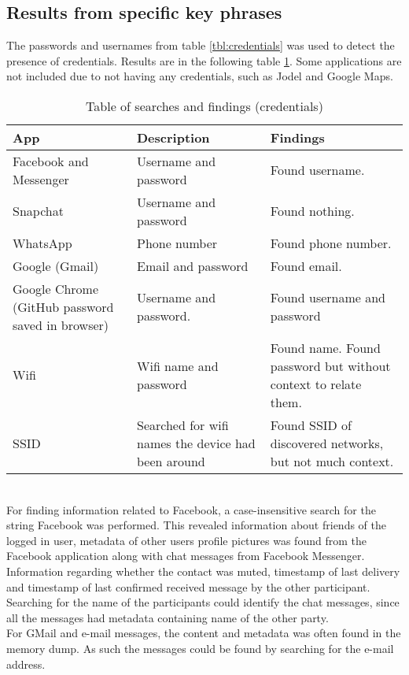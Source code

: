 \subsection{Results from specific key phrases}
The passwords and usernames from table \ref{tbl:credentials} was used to detect the presence of credentials. Results are in the following table \ref{spesificS_table}. Some applications are not included due to not having any credentials, such as Jodel and Google Maps.\\
\begin{table}[h]
\centering
\begin{tabular}{|m{2.5cm}|m{2.5cm}|m{2.5cm}|}
\hline
App & Description & Findings \\
\hline
Facebook and Messenger & Username and password & Found username.  \\
\hline
Snapchat & Username and password & Found nothing. \\
\hline
WhatsApp & Phone number & Found phone number. \\
\hline 
Google (Gmail) & Email and password & Found email.\\
\hline
Google Chrome (GitHub password saved in browser) & Username and password. & Found username and password \\
\hline
Wifi & Wifi name and password & Found name. Found password but without context to relate them.\\  
\hline
SSID & Searched for wifi names the device had been around & Found SSID of discovered networks, but not much context.  \\  
\hline
\end{tabular}
\caption{Table of searches and findings (credentials)}
\label{spesificS_table}
\end{table}
\\For finding information related to Facebook, a case-insensitive search for the string Facebook was performed. This revealed information about friends of the logged in user, metadata of other users profile pictures was found from the Facebook application along with chat messages from Facebook Messenger. Information regarding whether the contact was muted, timestamp of last delivery and timestamp of last confirmed received message by the other participant. Searching for the name of the participants could identify the chat messages, since all the messages had metadata containing name of the other party.\\
For GMail and e-mail messages, the content and metadata was often found in the memory dump. As such the messages could be found by searching for the e-mail address.

